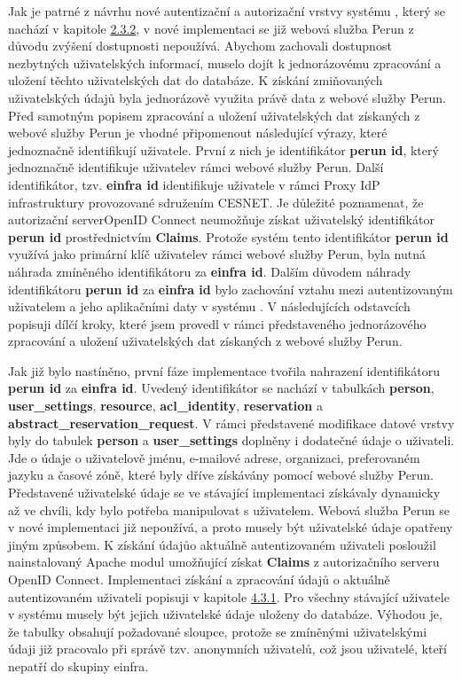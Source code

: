 \documentclass[
  printed, %
  twoside, %
  table,   %
  nolof,     %
  nolot,     %
]{fithesis3}
\begin{document}
Jak je patrné z návrhu nové autentizační a autorizační vrstvy systému , který se nachází v kapitole \hyperref[shong-proposal]{2.3.2}, v nové implementaci se již webová služba Perun z důvodu zvýšení dostupnosti nepoužívá. Abychom zachovali dostupnost nezbytných uživatelských informací, muselo dojít k jednorázovému zpracování a uložení těchto uživatelských dat do databáze. K získání zmiňovaných uživatelských údajů byla jednorázově využita právě data z webové služby Perun. Před samotným popisem zpracování a uložení uživatelských dat získaných z webové služby Perun je vhodné připomenout následující výrazy, které jednoznačně identifikují uživatele. První z nich je identifikátor \textbf{perun id}, který jednoznačně identifikuje uživatele\break v rámci webové služby Perun. Další identifikátor, tzv. \textbf{einfra id} identifikuje uživatele v rámci Proxy IdP infrastruktury provozované sdružením CESNET. Je důležité poznamenat, že autorizační server\break OpenID Connect neumožňuje získat uživatelský identifikátor \textbf{perun id} prostřednictvím \textbf{Claims}. Protože systém  tento identifikátor \textbf{perun id} využívá jako primární klíč uživatele\break v rámci webové služby Perun, byla nutná náhrada zmíněného identifikátoru za \textbf{einfra id}. Dalším důvodem náhrady identifikátoru \textbf{perun id} za \textbf{einfra id} bylo zachování vztahu mezi autentizovaným uživatelem a jeho aplikačními daty v systému . V následujících odstavcích popisuji dílčí kroky, které jsem provedl v rámci představeného jednorázového zpracování a uložení uživatelských dat získaných z webové služby Perun. 

\par

Jak již bylo nastíněno, první fáze implementace tvořila nahrazení identifikátoru \textbf{perun id} za \textbf{einfra id}. Uvedený identifikátor se nachází v tabulkách \textbf{person}, \textbf{user\_settings}, \textbf{resource}, \textbf{acl\_identity}, \textbf{reservation} a \textbf{abstract\_reservation\_request}. V rámci představené modifikace datové vrstvy byly do tabulek \textbf{person} a \textbf{user\_settings} doplněny i dodatečné údaje o uživateli. Jde o údaje o uživatelově jménu, e-mailové adrese, organizaci, preferovaném jazyku a časové zóně, které byly dříve získávány pomocí webové služby Perun. Představené uživatelské údaje se ve stávající implementaci získávaly dynamicky až ve chvíli, kdy bylo potřeba manipulovat s uživatelem. Webová služba Perun se v nové implementaci již nepoužívá, a proto musely být uživatelské údaje opatřeny jiným způsobem. K získání údajů\break o aktuálně autentizovaném uživateli posloužil nainstalovaný Apache modul umožňující získat \textbf{Claims} z autorizačního serveru OpenID Connect. Implementaci získání a zpracování údajů o aktuálně autentizovaném uživateli popisuji v kapitole \hyperref[ShongoImpl-authn]{4.3.1}. Pro všechny stávající uživatele v systému  musely být jejich uživatelské údaje uloženy do databáze. Výhodou je, že tabulky obsahují požadované sloupce, protože se zmíněnými uživatelskými údaji již pracovalo při správě tzv. anonymních uživatelů, což jsou uživatelé, kteří nepatří do skupiny einfra. 
\par
\end{document}
